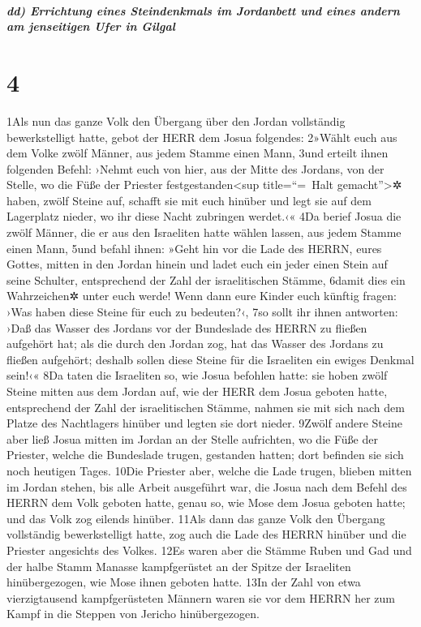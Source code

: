 \hypertarget{dd-errichtung-eines-steindenkmals-im-jordanbett-und-eines-andern-am-jenseitigen-ufer-in-gilgal}{%
\subparagraph{dd) Errichtung eines Steindenkmals im Jordanbett und eines
andern am jenseitigen Ufer in
Gilgal}\label{dd-errichtung-eines-steindenkmals-im-jordanbett-und-eines-andern-am-jenseitigen-ufer-in-gilgal}}

\hypertarget{section-3}{%
\section{4}\label{section-3}}

1Als nun das ganze Volk den Übergang über den Jordan vollständig
bewerkstelligt hatte, gebot der HERR dem Josua folgendes: 2»Wählt euch
aus dem Volke zwölf Männer, aus jedem Stamme einen Mann, 3und erteilt
ihnen folgenden Befehl: ›Nehmt euch von hier, aus der Mitte des Jordans,
von der Stelle, wo die Füße der Priester festgestanden\textless sup
title=``=~Halt gemacht''\textgreater✲ haben, zwölf Steine auf, schafft
sie mit euch hinüber und legt sie auf dem Lagerplatz nieder, wo ihr
diese Nacht zubringen werdet.‹« 4Da berief Josua die zwölf Männer, die
er aus den Israeliten hatte wählen lassen, aus jedem Stamme einen Mann,
5und befahl ihnen: »Geht hin vor die Lade des HERRN, eures Gottes,
mitten in den Jordan hinein und ladet euch ein jeder einen Stein auf
seine Schulter, entsprechend der Zahl der israelitischen Stämme, 6damit
dies ein Wahrzeichen✲ unter euch werde! Wenn dann eure Kinder euch
künftig fragen: ›Was haben diese Steine für euch zu bedeuten?‹, 7so
sollt ihr ihnen antworten: ›Daß das Wasser des Jordans vor der
Bundeslade des HERRN zu fließen aufgehört hat; als die durch den Jordan
zog, hat das Wasser des Jordans zu fließen aufgehört; deshalb sollen
diese Steine für die Israeliten ein ewiges Denkmal sein!‹« 8Da taten die
Israeliten so, wie Josua befohlen hatte: sie hoben zwölf Steine mitten
aus dem Jordan auf, wie der HERR dem Josua geboten hatte, entsprechend
der Zahl der israelitischen Stämme, nahmen sie mit sich nach dem Platze
des Nachtlagers hinüber und legten sie dort nieder. 9Zwölf andere Steine
aber ließ Josua mitten im Jordan an der Stelle aufrichten, wo die Füße
der Priester, welche die Bundeslade trugen, gestanden hatten; dort
befinden sie sich noch heutigen Tages. 10Die Priester aber, welche die
Lade trugen, blieben mitten im Jordan stehen, bis alle Arbeit ausgeführt
war, die Josua nach dem Befehl des HERRN dem Volk geboten hatte, genau
so, wie Mose dem Josua geboten hatte; und das Volk zog eilends hinüber.
11Als dann das ganze Volk den Übergang vollständig bewerkstelligt hatte,
zog auch die Lade des HERRN hinüber und die Priester angesichts des
Volkes. 12Es waren aber die Stämme Ruben und Gad und der halbe Stamm
Manasse kampfgerüstet an der Spitze der Israeliten hinübergezogen, wie
Mose ihnen geboten hatte. 13In der Zahl von etwa vierzigtausend
kampfgerüsteten Männern waren sie vor dem HERRN her zum Kampf in die
Steppen von Jericho hinübergezogen.

